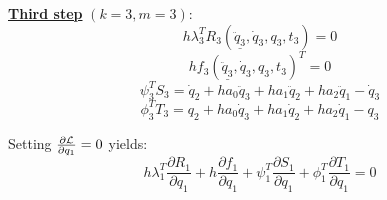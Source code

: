 \documentclass{beamer}
\newcommand{\pd}[2]{\frac{\partial #1}{\partial #2}}
\begin{document}
\begin{frame}[allowframebreaks]
{    \underline{\textbf{Third step}} $(k=3, m=3)$: 
    $$h\lambda_3^TR_3(\underline{\ddot{q}_3}, \dot{q}_3, q_3, t_3) = 0$$
    $$hf_3(\underline{\ddot{q}_3}, \dot{q}_3, q_3, t_3)^T = 0$$
    $$ \psi_3^TS_3 = \dot{q}_{2}  + h a_0 \ddot{q}_{3} + h a_1 \ddot{q}_{2}  + h a_2 \ddot{q}_{1} - \dot{q}_3 $$ 
    $$ \phi_3^TT_3 = {q}_{2}  + h a_0 \dot{q}_{3} + h a_1 \dot{q}_{2}  + h a_2 \dot{q}_{1} - {q}_3 $$ 

    \framebreak
   
    Setting $\pd{\cal{L}}{{q}_1} = 0$ yields:
    $$ h \lambda_1^T \pd{R_1}{q_1} + h \pd{f_1}{q_1} + \psi_1^T \pd{S_1}{q_1} + \phi_1^T \pd{T_1}{q_1} = 0 $$

  }

\end{frame}
\end{document}

